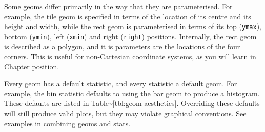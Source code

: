 Some geoms differ primarily in the way that they are parameterised. For
example, the tile geom is specified in terms of the location of its
centre and its height and width, while the rect geom is parameterised in
terms of its top (\texttt{ymax}), bottom (\texttt{ymin}), left
(\texttt{xmin}) and right (\texttt{right}) positions. 
Internally, the rect geom is described as a polygon, and it is
parameters are the locations of the four corners. This is useful for
non-Cartesian coordinate systems, as you will learn in Chapter
\hyperref[cha:position]{position}. 

Every geom has a default statistic, and every statistic a default geom.
For example, the bin statistic defaults to using the bar geom to produce
a histogram. These defaults are listed in
Table\textasciitilde{}\ref{tbl:geom-aesthetics}. Overriding these
defaults will still produce valid plots, but they may violate graphical
conventions. See examples in \hyperref[sub:new-plot-types]{combining
geoms and stats}. 

